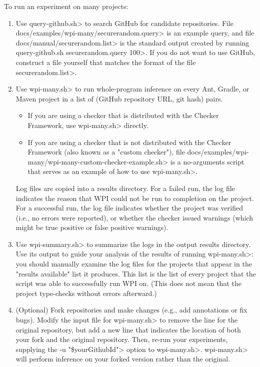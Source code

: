 To run an experiment on many projects:
\begin{enumerate}
\item Use \<query-github.sh> to search GitHub for candidate repositories.
File \<docs/examples/wpi-many/securerandom.query> is an example query, and file
\<docs/manual/securerandom.list> is the standard output
created by running \<query-github.sh securerandom.query 100>. If you do
not want to use GitHub, construct a file yourself that matches the format of
the file \<securerandom.list>.

\item Use \<wpi-many.sh> to run whole-program inference on every
Ant, Gradle, or Maven project in a list of (GitHub repository URL, git hash)
pairs.
\begin{itemize}
\item If you are using a checker that is distributed with the Checker
Framework, use \<wpi-many.sh> directly.
\item If you are using a checker that is not distributed with the Checker
Framework (also known as a "custom checker"), file
\<docs/examples/wpi-many/wpi-many-custom-checker-example.sh> is a no-arguments
script that serves as an example of how to use \<wpi-many.sh>.
\end{itemize}

Log files are copied into a results directory.
For a failed run, the log file indicates the reason that WPI could not
be run to completion on the project.
For a successful run, the log file indicates whether the project was verified
(i.e., no errors were reported), or whether the checker issued warnings
(which might be true positive or false positive warnings).

\item Use \<wpi-summary.sh> to summarize the logs in the output results directory.
Use its output to guide your analysis of the results of running \<wpi-many.sh>:
you should manually examine the log files for the projects that appear in the
"results available" list it produces. This list is the list of every project
that the script was able to successfully run WPI on.  (This does not mean
that the project type-checks without errors afterward.)

\item (Optional) Fork repositories and make changes (e.g., add annotations or fix bugs).
Modify the input file for \<wpi-many.sh> to remove the line for the original repository,
but add a new line that indicates the location of both your
fork and the original repository.
Then, re-run your experiments, supplying the \<-u "\$yourGithubId"> option to \<wpi-many.sh>.
\<wpi-many.sh> will perform inference on your forked version rather than
the original.

\end{enumerate}

